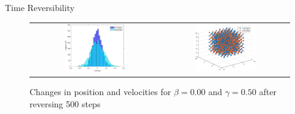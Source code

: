 \documentclass{beamer}
\begin{document}
\begin{frame}{Time Reversibility}
 {
	\begin{figure}
		\centering
 		\begin{tabular}{@{}cc@{}}
			\includegraphics[width=0.5\textwidth]{time_reversible_b0,0g0,50_1000_velocity_histogram.eps} &
    			\includegraphics[width=0.5\textwidth]{time_reversible_b0,0g0,50_1000_position_overlay.eps} \\
		\end{tabular}
  		\caption{Changes in position and velocities for $\beta = 0.00$ and $\gamma = 0.50$ after reversing 500 steps}
		\label{fig:time_reversible_b0.00g0.50_1000}
	\end{figure}
}


\end{frame}
\end{document}
